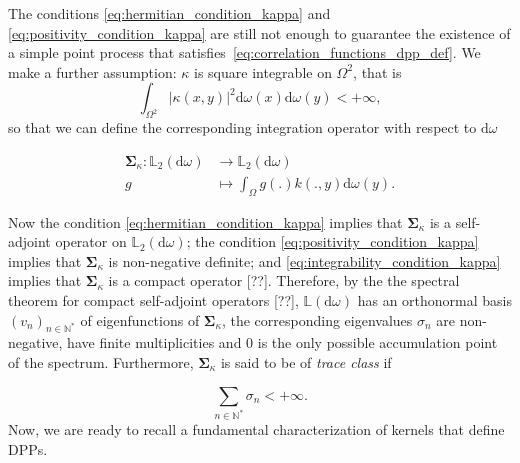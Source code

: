 \documentclass[twoside,11pt]{book}
\numberwithin{theorem}{chapter}
\numberwithin{definition}{chapter}
\numberwithin{proposition}{chapter}
\numberwithin{corollary}{chapter}
\numberwithin{example}{chapter}
\numberwithin{lemma}{chapter}
\begin{document}
The conditions \eqref{eq:hermitian_condition_kappa} and \eqref{eq:positivity_condition_kappa} are still not enough to guarantee the existence of a simple point process that satisfies~\eqref{eq:correlation_functions_dpp_def}. 
 We make a further assumption: $\kappa$ is square integrable on $\Omega^{2}$, that is 
\begin{equation}\label{eq:integrability_condition_kappa}
\int_{\Omega^{2}} |\kappa(x,y)|^{2} \mathrm{d}\omega(x) \mathrm{d}\omega(y) < +\infty,
\end{equation}
so that we can define the corresponding integration operator with respect to $\mathrm{d}\omega$



\begin{align}
  \bm{\Sigma}_{\kappa} : \mathbb{L}_{2}(\mathrm{d}\omega) & \rightarrow \mathbb{L}_{2}(\mathrm{d}\omega) \nonumber \\
  g & \mapsto \int_{\Omega}g(.) k(.,y) \mathrm{d}\omega(y). \nonumber
\end{align}

Now the condition \eqref{eq:hermitian_condition_kappa} implies that $\bm{\Sigma}_{\kappa}$ is a self-adjoint operator on $\mathbb{L}_{2}(\mathrm{d}\omega)$; the condition \eqref{eq:positivity_condition_kappa} implies that $\bm{\Sigma}_{\kappa}$ is non-negative definite; and \eqref{eq:integrability_condition_kappa} implies that $\bm{\Sigma}_{\kappa}$ is a compact operator [??]. Therefore, by the the spectral theorem for compact self-adjoint operators [??], $\mathbb{L}(\mathrm{d}\omega)$ has an orthonormal basis $(v_{n})_{n \in \mathbb{N}^{*}}$ of eigenfunctions of $\bm{\Sigma}_{\kappa}$, the corresponding eigenvalues $\sigma_n$ are non-negative, have finite multiplicities and $0$ is the only possible accumulation point of the spectrum. Furthermore, $\bm{\Sigma}_{\kappa}$ is said to be of \emph{trace class} if

\begin{equation}\label{eq:traceclass_condition_kappa}
\sum\limits_{n \in \mathbb{N}^{*}} \sigma_n <+\infty.
\end{equation}
Now, we are ready to recall a fundamental characterization of kernels that define DPPs.

\end{document}
